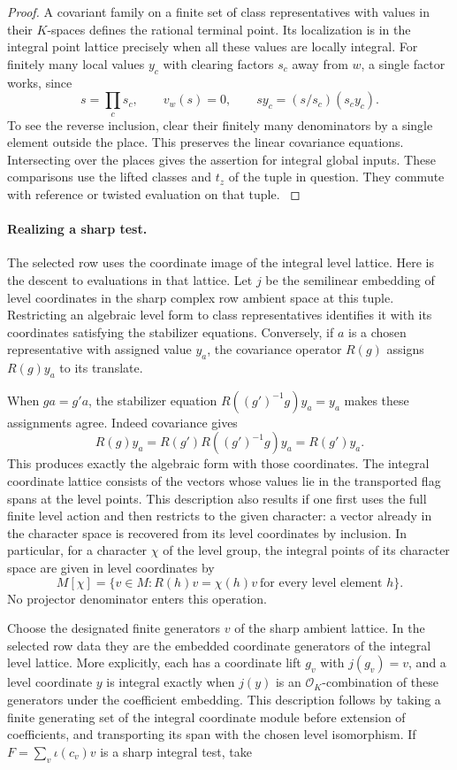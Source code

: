 \begin{proof}
A covariant family on a finite set of class representatives
with values in their \(K\)-spaces defines the rational terminal
point. Its localization is in the integral point lattice
precisely when all these values are locally integral.
For finitely many local values \(y_c\) with clearing factors \(s_c\) away from \(w\), a single factor works, since
\[
  s=\prod_c s_c,\qquad v_w(s)=0,\qquad sy_c=(s/s_c)(s_c y_c).
\]
 To
see the reverse inclusion, clear their finitely many
denominators by a single element outside the place. This
preserves the linear covariance equations. Intersecting over
the places gives the assertion for integral global inputs.
These comparisons use the lifted classes and \(t_z\) of the
tuple in question. They commute with reference or twisted
evaluation on that tuple. \label{cor:terminal-realization-3}
\end{proof}

\paragraph{Realizing a sharp test.}
The selected row uses the coordinate image of the integral
level lattice. Here is the descent to evaluations in that
lattice. Let \(j\) be the semilinear embedding of level
coordinates in the sharp complex row ambient space at this
tuple. Restricting an algebraic level form to class
representatives identifies it with its coordinates satisfying
the stabilizer equations. Conversely, if \(a\) is a chosen representative with
assigned value \(y_a\), the covariance operator \(R(g)\)
assigns \(R(g)y_a\) to its translate.

When \(ga=g'a\),
the stabilizer equation \(R((g')^{-1}g)y_a=y_a\)
makes these assignments agree.
Indeed covariance gives
\[
  R(g)y_a=R(g')R((g')^{-1}g)y_a=R(g')y_a .
\]
 This produces exactly the
algebraic form with those coordinates. The integral coordinate lattice
consists of the vectors whose values lie in the transported
flag spans at the level points. This description also results
if one first uses the full finite level action and then
restricts to the given character: a vector already in the
character space is recovered from its level coordinates by
inclusion.
In particular, for a character \(\chi\) of the level group, the integral points of its character space are given in level coordinates by
\[
  M[\chi]=\{v\in M:R(h)v=\chi(h)v\ \text{for every level element }h\}.
\]
 No projector denominator enters this operation.

Choose the designated finite generators \(v\) of the sharp
ambient lattice. In the selected row data they are the
embedded coordinate generators of the integral level lattice.
More explicitly, each has a coordinate lift \(g_v\) with
\(j(g_v)=v\), and a level coordinate \(y\) is integral exactly
when \(j(y)\) is an \(\mathcal O_K\)-combination of these
generators under the coefficient embedding. This description
follows by taking a finite generating set of the integral
coordinate module before extension of coefficients, and
transporting its span with the chosen level isomorphism.
If \(F=\sum_v\iota(c_v)v\) is a sharp integral test, take

